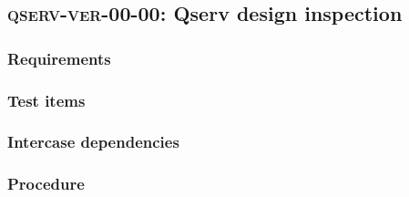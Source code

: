 \subsection{\textsc{qserv-ver-00-00}: Qserv design inspection}
\label{qserv-ver-00-00}

\subsubsection{Requirements}

\subsubsection{Test items}

\subsubsection{Intercase dependencies}

\subsubsection{Procedure}
